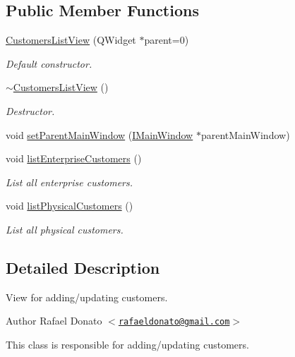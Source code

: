 \subsection*{\-Public \-Member \-Functions}
\begin{DoxyCompactItemize}
\item 
\hyperlink{class_customers_list_view_a1f4a38b73d379c2b4cfe5f1be5a28e70}{\-Customers\-List\-View} (\-Q\-Widget $\ast$parent=0)
\begin{DoxyCompactList}\small\item\em \-Default constructor. \end{DoxyCompactList}\item 
\hyperlink{class_customers_list_view_a26a72e4e48eb230ae76881ad83cb1012}{$\sim$\-Customers\-List\-View} ()
\begin{DoxyCompactList}\small\item\em \-Destructor. \end{DoxyCompactList}\item 
void \hyperlink{class_customers_list_view_a0e4c69780c292aa34a30e2ed873ce8f5}{set\-Parent\-Main\-Window} (\hyperlink{class_i_main_window}{\-I\-Main\-Window} $\ast$parent\-Main\-Window)
\item 
void \hyperlink{class_customers_list_view_a6c897807aca7f2619113118304f294ea}{list\-Enterprise\-Customers} ()
\begin{DoxyCompactList}\small\item\em \-List all enterprise customers. \end{DoxyCompactList}\item 
void \hyperlink{class_customers_list_view_a3ba6b233680482495c767d0720b0c241}{list\-Physical\-Customers} ()
\begin{DoxyCompactList}\small\item\em \-List all physical customers. \end{DoxyCompactList}\end{DoxyCompactItemize}


\subsection{\-Detailed \-Description}
\-View for adding/updating customers. 

\begin{DoxyAuthor}{\-Author}
\-Rafael \-Donato $<$\href{mailto:rafaeldonato@gmail.com}{\tt rafaeldonato@gmail.\-com}$>$
\end{DoxyAuthor}
\-This class is responsible for adding/updating customers. 

